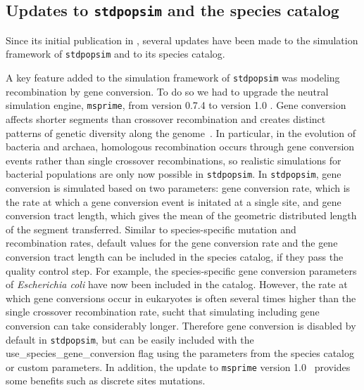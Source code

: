 \documentclass[hidelinks]{article}
\newcommand{\stdpopsim}{\texttt{stdpopsim}\xspace}
\begin{document}
\hypertarget{sec3}{%
	\subsection*{Updates to \stdpopsim and the species catalog}\label{sec:expanded-catalog}}

Since its initial publication in \cite{Adrion2020}, several updates have been made
to  the simulation framework of \stdpopsim and to its species catalog.

A key feature added to the simulation framework of \stdpopsim
was modeling recombination by gene conversion. %
To do so we had to upgrade the neutral simulation engine,
\texttt{msprime}, from version 0.7.4 to version 1.0 \citep{Baumdicker2022}. %
Gene conversion affects shorter segments than crossover recombination and creates distinct patterns of genetic diversity along the genome~\citep{Korunes2017}.
In particular, in the evolution of bacteria and archaea, homologous recombination occurs through gene conversion events rather than single crossover recombinations, so realistic simulations for bacterial populations are only now possible in \stdpopsim.
In \stdpopsim, gene conversion is simulated based on two parameters: gene conversion rate, which
is the rate at which a gene conversion event is initated at a single site, and gene conversion tract length,
which gives the mean of the geometric distributed length of the segment transferred.
Similar to species-specific mutation and recombination rates,
default values for the gene conversion rate and the gene conversion tract length can be included in the species catalog, 
if they pass the quality control step.
For example, the species-specific gene conversion parameters of \emph{Escherichia coli} have now been included in the catalog.
However, the rate at which gene conversions occur in eukaryotes is often several times higher than 
the single crossover recombination rate, sucht that simulating including gene conversion can take considerably longer.
Therefore gene conversion is disabled by default in \stdpopsim,
but can be easily included with the use\_species\_gene\_conversion flag using the parameters from the species catalog or custom parameters.
In addition, the update to \texttt{msprime} version 1.0~\citep{Baumdicker2022}
provides some benefits such as discrete sites mutations.
\end{document}

